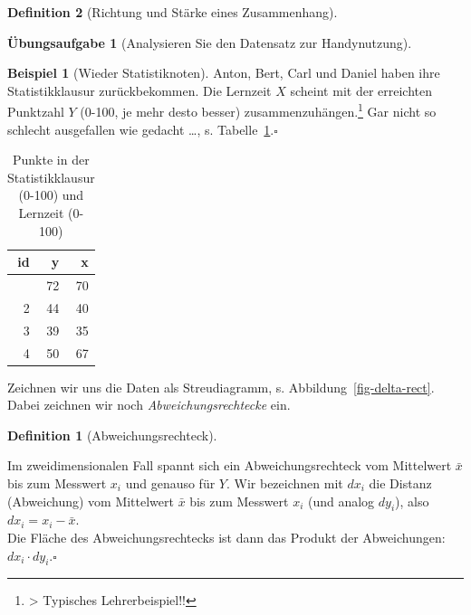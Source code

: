 \documentclass[
  a4paper,
  DIV=11]{scrreprt}
\theoremstyle{definition}
\newtheorem{exercise}{Übungsaufgabe}[chapter]
\theoremstyle{definition}
\newtheorem{example}{Beispiel}[chapter]
\theoremstyle{definition}
\newtheorem{definition}{Definition}[chapter]
\theoremstyle{remark}
\begin{document}
\begin{definition}[Richtung und Stärke eines
Zusammenhang]
\begin{exercise}[Analysieren Sie den Datensatz zur
Handynutzung]
\begin{example}[Wieder
Statistiknoten]
Anton, Bert, Carl und Daniel haben ihre Statistikklausur zurückbekommen.
Die Lernzeit \(X\) scheint mit der erreichten Punktzahl \(Y\) (0-100, je
mehr desto besser) zusammenzuhängen.\footnote{\textgreater{} Typisches
  Lehrerbeispiel!!} Gar nicht so schlecht ausgefallen wie gedacht
\ldots, s. Tabelle~\ref{tbl-noten2}.\(\square\)

\end{example}

\begin{longtable}[]{@{}rrr@{}}

\caption{\label{tbl-noten2}Punkte in der Statistikklausur (0-100) und
Lernzeit (0-100)}

\tabularnewline

\toprule\noalign{}
id & y & x \\
\midrule\noalign{}
\endhead
\bottomrule\noalign{}
\endlastfoot
1 & 72 & 70 \\
2 & 44 & 40 \\
3 & 39 & 35 \\
4 & 50 & 67 \\

\end{longtable}

Zeichnen wir uns die Daten als Streudiagramm, s.
Abbildung~\ref{fig-delta-rect}. Dabei zeichnen wir noch
\emph{Abweichungsrechtecke} ein.

\begin{definition}[Abweichungsrechteck]\protect\hypertarget{def-abweichungsrechteck}{}\label{def-abweichungsrechteck}

Im zweidimensionalen Fall spannt sich ein Abweichungsrechteck vom
Mittelwert \(\bar{x}\) bis zum Messwert \(x_i\) und genauso für \(Y\).
Wir bezeichnen mit \(dx_i\) die Distanz (Abweichung) vom Mittelwert
\(\bar{x}\) bis zum Messwert \(x_i\) (und analog \(dy_i\)), also
\(dx_i = x_i - \bar{x}\).\\
Die Fläche des Abweichungsrechtecks ist dann das Produkt der
Abweichungen: \(dx_i \cdot dy_i\).\(\square\)

\end{definition}

\begin{figure}

\centering{

}
\end{figure}
\end{exercise}
\end{definition}
\end{document}
